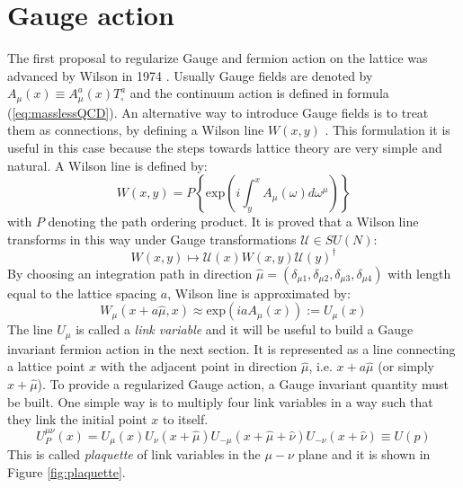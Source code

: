 \documentclass[english, LaM, oneside, noexaminfo]{sapthesis}
\begin{document}
\section{Gauge action}
\noindent
The first proposal to regularize Gauge and fermion action on the lattice was advanced by Wilson in 1974 \cite{Wilson-Confinement-of-Quarks}.
Usually Gauge fields are denoted by $A_\mu (x) \equiv A_\mu^a(x)T^a_{\square}$ and the continuum action is defined in formula (\ref{eq:masslessQCD}).
An alternative way to introduce Gauge fields is to treat them as connections, by defining a Wilson line $W(x,y)$ \cite{Schwartz}.
This formulation it is useful in this case because the steps towards lattice theory are very simple and natural.
A Wilson line is defined by:
\begin{equation*}
    W(x,y) = P \left\{\text{exp}\left(i\int_y^x A_\mu(\omega)d\omega^\mu\right)\right\}
\end{equation*}
with $P$ denoting the path ordering product.
It is proved that a Wilson line transforms in this way under Gauge transformations $\mathcal{U}\in SU(N)$:
\begin{equation}\label{eq:wline-transformation}
    W(x,y) \longmapsto \mathcal{U}(x) W(x,y) \mathcal{U}(y)^\dagger
\end{equation}
By choosing an integration path in direction $\hat\mu = (\delta_{\mu 1},\delta_{\mu 2},\delta_{\mu 3},\delta_{\mu 4})$ with length equal to the lattice spacing $a$, Wilson line is approximated by:
\begin{equation*}
    W_\mu(x+a\hat\mu, x) \approx \text{exp}\left(iaA_\mu (x)\right) := U_\mu (x)
\end{equation*}
The line $U_\mu$ is called a {\it link variable} and it will be useful to build a Gauge invariant fermion action in the next section.
It is represented as a line connecting a lattice point $x$ with the adjacent point in direction $\hat\mu$, i.e. $x+a\hat\mu$ (or simply $x+\hat\mu$).
\newline
To provide a regularized Gauge action, a Gauge invariant quantity must be built.
One simple way is to multiply four link variables in a way such that they link the initial point $x$ to itself.
\begin{equation*}
    U_P^{\mu\nu}(x) = U_\mu (x) U_\nu (x+\hat\mu) U_{-\mu} (x+\hat\mu+\hat\nu) U_{-\nu} (x+\hat\nu)  \equiv U(p)
\end{equation*}
This is called {\it plaquette} of link variables in the $\mu-\nu$ plane and it is shown in Figure \ref{fig:plaquette}.
\end{document}
